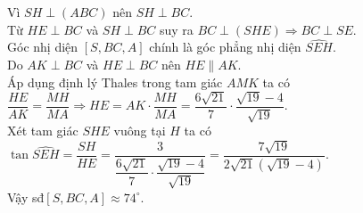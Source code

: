 \begin{ex}
{		Vì $SH \perp (ABC)$ nên $SH \perp BC$.\\
		Từ $HE \perp BC$ và $SH \perp BC$ suy ra $BC \perp (SHE) \Rightarrow BC \perp SE$.\\
		Góc nhị diện $[S, BC, A]$ chính là góc phẳng nhị diện $\widehat{SEH}$.\\
		Do $AK \perp BC$ và $HE \perp BC$ nên $HE \parallel AK$.\\
		Áp dụng định lý Thales trong tam giác $AMK$ ta có $\dfrac{HE}{AK} = \dfrac{MH}{MA} \Rightarrow HE = AK \cdot \dfrac{MH}{MA} = \dfrac{6\sqrt{21}}{7} \cdot \dfrac{\sqrt{19} - 4}{\sqrt{19}}$.\\
		Xét tam giác $SHE$ vuông tại $H$ ta có $\tan \widehat{SEH} = \dfrac{SH}{HE} = \dfrac{3}{\dfrac{6\sqrt{21}}{7} \cdot \dfrac{\sqrt{19} - 4}{\sqrt{19}}} = \dfrac{7\sqrt{19}}{2\sqrt{21}(\sqrt{19}-4)}$.\\
		Vậy sđ$[S,BC,A]\approx 74^\circ$.
	}
\end{ex}
